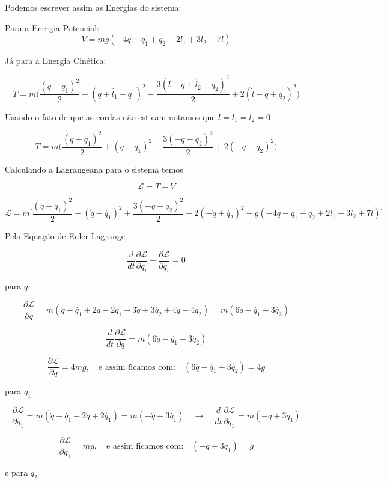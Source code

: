 \documentclass[a4paper,12pt]{exam}
\begin{document}
	Podemos escrever assim as Energias do sistema:
	
	Para a Energia Potencial:
	\[ V = mg( -4q -q_1 + q_2 + 2l_1 + 3l_2 + 7l )\]
	
	Já para a Energia Cinética:
	
	\[ T = m \Big(\frac{(\dot{q}+\dot{q_1})^2}{2} + ( \dot{q}+\dot{l_1} - \dot{q_1})^2 + \frac{3(\dot{l}-\dot{q}+\dot{l_2}-\dot{q_2})^2}{2} + 2(\dot{l}- \dot{q}+\dot{q_2})^2 \Big) \]

	Usando o fato de que as cordas não esticam notamos que $\dot{l} = \dot{l_1} = \dot{l_2} = 0$
	
	\[ T = m \Big(\frac{(\dot{q}+\dot{q_1})^2}{2} + ( \dot{q}-\dot{q_1})^2 + \frac{3(-\dot{q}-\dot{q_2})^2}{2} + 2(-\dot{q}+\dot{q_2})^2 \Big) \]
	
	Calculando a Lagrangeana para o sistema temos
	
	\[ \mathcal{L} = T - V \]
	
	\[ \mathcal{L} = m\Bigg[ \frac{(\dot{q}+\dot{q_1})^2}{2} + (\dot{q}-\dot{q_1})^2 + \frac{3(-\dot{q}-\dot{q_2})^2}{2} + 2(-\dot{q}+\dot{q_2})^2 - g( -4q -q_1 + q_2 + 2l_1 + 3l_2 + 7l ) \Bigg] \]
	
	Pela Equação de Euler-Lagrange
	
	\[\frac{d}{dt} \frac{\partial \mathcal{L} }{\partial \dot{q_i}} - \frac{\partial \mathcal{L} }{\partial q_i }  = 0\]
	
	para $q$
	
	\[ \frac{\partial \mathcal{L} }{\partial \dot{q}} = m(\dot{q}+\dot{q_1} + 2\dot{q}-2\dot{q_1} + 3\dot{q} + 3\dot{q_2} +4\dot{q} - 4\dot{q_2}) = m(6\dot{q} -\dot{q_1} + 3\dot{q_2})\]
	
	\[ \frac{d}{dt} \frac{\partial \mathcal{L} }{\partial \dot{q}} = m(6\ddot{q} -\ddot{q_1} + 3\ddot{q_2})\]
	
	\[\frac{\partial \mathcal{L} }{\partial q } = 4mg, \quad \text{e assim ficamos com:} \quad (6\ddot{q} -\ddot{q_1} + 3\ddot{q_2}) = 4g\]
	
	para $q_1$
	
	\[\frac{\partial \mathcal{L} }{\partial \dot{q_1}} = m( \dot{q} + \dot{q_1} -2\dot{q} +2\dot{q_1} ) = m(-\dot{q}+3\dot{q_1} ) \quad \to \quad \frac{d}{dt}\frac{\partial \mathcal{L} }{\partial \dot{q_1}} = m(-\ddot{q}+3\ddot{q_1}) \]
	
	\[\frac{\partial \mathcal{L} }{\partial q_1} = mg, \quad \text{e assim ficamos com:} \quad (-\ddot{q}+3\ddot{q_1}) = g\]
	
	e para $q_2$
	
\end{document}
